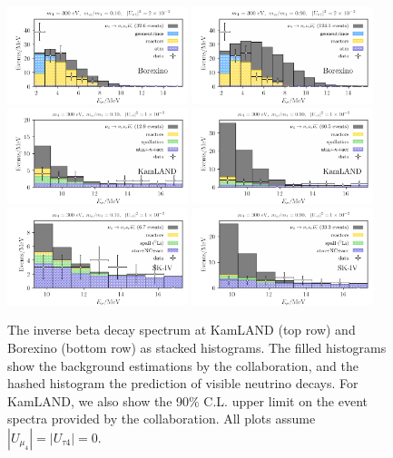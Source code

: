 \documentclass[
reprint,
superscriptaddress,
showpacs,
preprintnumbers,
nofootinbib,
nobibnotes,
amsmath,
amssymb, 
aps,
prd,
floatfix
]{revtex4-1}
\begin{document}
\begin{figure}[t]
\centering
\includegraphics[width=0.47\textwidth]{scalar_borexino_MN_300_MB_30.pdf}
\includegraphics[width=0.47\textwidth]{scalar_borexino_MN_300_MB_270.pdf} \\
\includegraphics[width=0.47\textwidth]{binned_scalar_kamland_MN_300_MB_30.pdf}
\includegraphics[width=0.47\textwidth]{binned_scalar_kamland_MN_300_MB_270.pdf}\\
\includegraphics[width=0.47\textwidth]{scalar_SK-IV_MN_300_MB_30.pdf}
\includegraphics[width=0.47\textwidth]{scalar_SK-IV_MN_300_MB_270.pdf} 
\caption{The inverse beta decay spectrum at KamLAND (top row) and Borexino (bottom row) as stacked histograms. The filled histograms show the background estimations by the collaboration, and the hashed histogram the prediction of visible neutrino decays. For KamLAND, we also show the 90\% C.L. upper limit on the event spectra provided by the collaboration. All plots assume $|U_{\mu_4}|=|U_{\tau 4}|=0$. \label{fig:exp_spectra}}
\end{figure}
\end{document}
